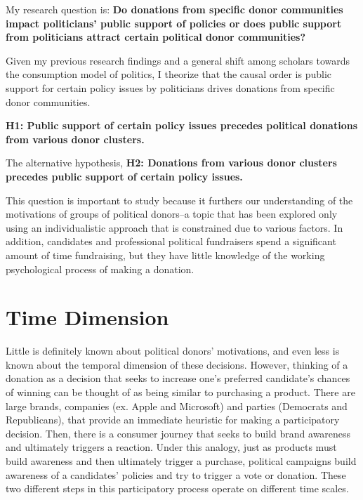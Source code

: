 \documentclass[12pt,]{article}
\begin{document}
My research question is: \textbf{Do donations from specific donor
communities impact politicians' public support of policies or does
public support from politicians attract certain political donor
communities?}

Given my previous research findings and a general shift among scholars
towards the consumption model of politics, I theorize that the causal
order is public support for certain policy issues by politicians drives
donations from specific donor communities.

\textbf{H1: Public support of certain policy issues precedes political
donations from various donor clusters.}

The alternative hypothesis, \textbf{H2: Donations from various donor
clusters precedes public support of certain policy issues.}

This question is important to study because it furthers our
understanding of the motivations of groups of political donors--a topic
that has been explored only using an individualistic approach that is
constrained due to various factors. In addition, candidates and
professional political fundraisers spend a significant amount of time
fundraising, but they have little knowledge of the working psychological
process of making a donation.

\hypertarget{time-dimension}{%
\section{Time Dimension}\label{time-dimension}}

Little is definitely known about political donors' motivations, and even
less is known about the temporal dimension of these decisions. However,
thinking of a donation as a decision that seeks to increase one's
preferred candidate's chances of winning can be thought of as being
similar to purchasing a product. There are large brands, companies (ex.
Apple and Microsoft) and parties (Democrats and Republicans), that
provide an immediate heuristic for making a participatory decision.
Then, there is a consumer journey that seeks to build brand awareness
and ultimately triggers a reaction. Under this analogy, just as products
must build awareness and then ultimately trigger a purchase, political
campaigns build awareness of a candidates' policies and try to trigger a
vote or donation. These two different steps in this participatory
process operate on different time scales.
\end{document}
